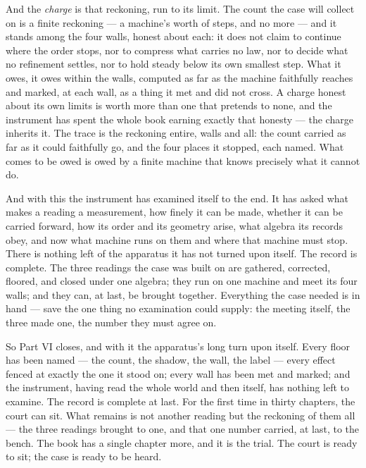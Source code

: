 And the \emph{charge} is that reckoning, run to its limit. The count the case will collect on is a finite
reckoning --- a machine's worth of steps, and no more --- and it stands among the four walls, honest about each:
it does not claim to continue where the order stops, nor to compress what carries no law, nor to decide what no
refinement settles, nor to hold steady below its own smallest step. What it owes, it owes within the walls,
computed as far as the machine faithfully reaches and marked, at each wall, as a thing it met and did not cross.
A charge honest about its own limits is worth more than one that pretends to none, and the instrument has spent
the whole book earning exactly that honesty --- the charge inherits it. The trace is the reckoning entire, walls
and all: the count carried as far as it could faithfully go, and the four places it stopped, each named. What
comes to be owed is owed by a finite machine that knows precisely what it cannot do.

And with this the instrument has examined itself to the end. It has asked what makes a reading a measurement,
how finely it can be made, whether it can be carried forward, how its order and its geometry arise, what algebra
its records obey, and now what machine runs on them and where that machine must stop. There is nothing left of
the apparatus it has not turned upon itself. The record is complete. The three readings the case was built on
are gathered, corrected, floored, and closed under one algebra; they run on one machine and meet its four walls;
and they can, at last, be brought together. Everything the case needed is in hand --- save the one thing no
examination could supply: the meeting itself, the three made one, the number they must agree on.

So Part VI closes, and with it the apparatus's long turn upon itself. Every floor has been named --- the count,
the shadow, the wall, the label --- every effect fenced at exactly the one it stood on; every wall has been met
and marked; and the instrument, having read the whole world and then itself, has nothing left to examine. The
record is complete at last. For the first time in thirty chapters, the court can sit. What remains is not another
reading but the reckoning of them all --- the three readings brought to one, and that one number carried, at
last, to the bench. The book has a single chapter more, and it is the trial. The court is ready to sit; the case
is ready to be heard.

